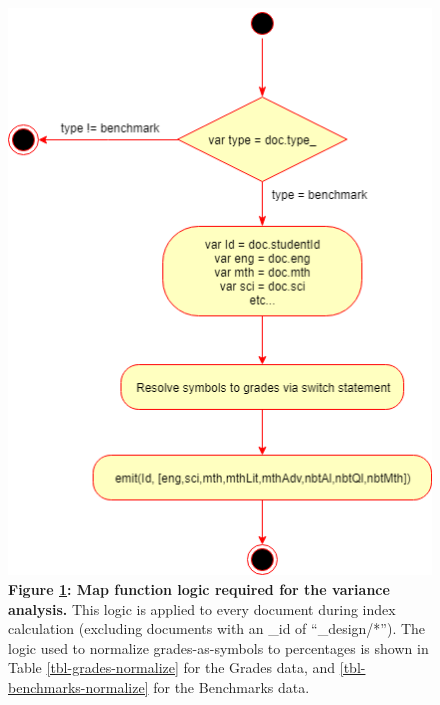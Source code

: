 \begin{figure}[H]
    \centering
    \begin{mdframed}
        \centering
        \includegraphics[scale=0.8]{./resources/figures/variance-map.png}
    \end{mdframed}
    \caption[Variance Map Function]{\textbf{Figure \ref{fig-variance-map-function}: Map function logic required for the variance analysis.} This logic is applied to every document during index calculation (excluding documents with an \_id of ``\_design/*''). The logic used to normalize grades-as-symbols to percentages is shown in Table \ref{tbl-grades-normalize} for the Grades data, and \ref{tbl-benchmarks-normalize} for the Benchmarks data.}
    \label{fig-variance-map-function}
\end{figure}
